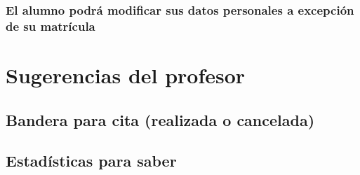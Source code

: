 \documentclass[11pt]{article}
\begin{document}
\subsubsection{El alumno podrá modificar sus datos personales a excepción de su matrícula}
\label{sec-2-4-4}
\section{Sugerencias del profesor}
\label{sec-3}
\subsection{Bandera para cita (realizada o cancelada)}
\label{sec-3-1}
\subsection{Estadísticas para saber}
\label{sec-3-2}
\end{document}
